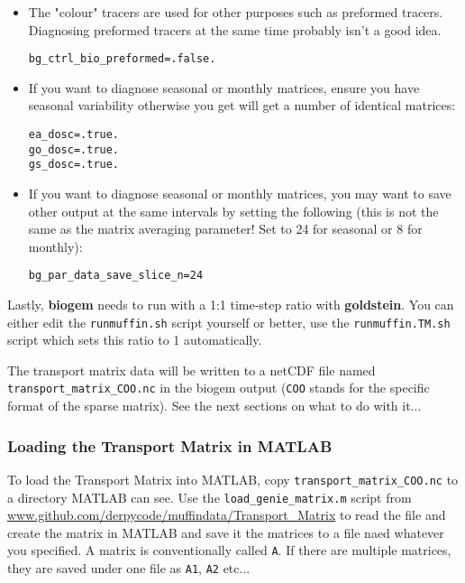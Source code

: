 \documentclass[11pt,fleqn]{book} %
\begin{document}
\begin{itemize}
\vspace{1mm}
\item The "colour" tracers are used for other purposes such as preformed tracers. Diagnosing preformed tracers at the same time probably isn't a good idea.
\begin{verbatim}
bg_ctrl_bio_preformed=.false.
\end{verbatim}
\item If you want to diagnose seasonal or monthly matrices, ensure you have seasonal variability otherwise you get will get a number of identical matrices:
\begin{verbatim}
ea_dosc=.true.
go_dosc=.true.
gs_dosc=.true.
\end{verbatim}
\item If you want to diagnose seasonal or monthly matrices, you may want to save other output at the same intervals by setting the following (this is not the same as the matrix averaging parameter! Set to 24 for seasonal or 8 for monthly):
\begin{verbatim}
bg_par_data_save_slice_n=24
\end{verbatim}
\end{itemize}

\noindent Lastly, \textbf{biogem} needs to run with a 1:1 time-step ratio with \textbf{goldstein}. You can either edit the \texttt{runmuffin.sh} script yourself or better, use the \texttt{runmuffin.TM.sh} script which sets this ratio to 1 automatically.

The transport matrix data will be written to a netCDF file named \texttt{transport\_matrix\_COO.nc} in the biogem output (\texttt{COO} stands for the specific format of the sparse matrix). See the next sections on what to do with it...


\subsubsection{Loading the Transport Matrix in MATLAB}

To load the Transport Matrix into MATLAB, copy \texttt{transport\_matrix\_COO.nc} to a directory MATLAB can see. Use the  \texttt{load\_genie\_matrix.m}  script from \url{www.github.com/derpycode/muffindata/Transport_Matrix} to read the file and create the matrix in MATLAB and save it the matrices to a file naed whatever you specified. A matrix is conventionally called \texttt{A}. If there are multiple matrices, they are saved under one file as \texttt{A1}, \texttt{A2} etc...
\end{document}
